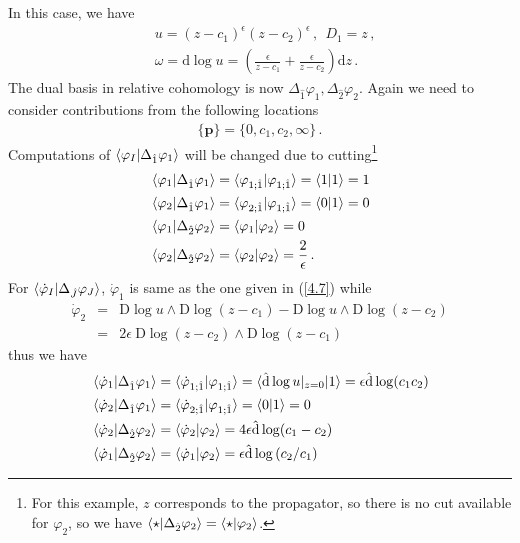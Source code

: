 \documentclass[a4paper,11pt]{article}
\newcommand{\nn}{\nonumber}
\newcommand{\nd}{\mathrm{d}}
\newcommand{\nD}{\mathrm{D}}
\newcommand{\nds}{\hat{\mathrm{d}}}
\newcommand{\ep}{\epsilon}
\newcommand{\bea}{\begin{eqnarray}}
\newcommand{\eea}{\end{eqnarray}}
\def\eref#1{(\ref{#1})}
\begin{document}
In this case, we have
\begin{align}
&u= (z-c_1)^\ep(z-c_2)^\ep
\, , \ \  D_1=z \, ,   \nn\\
&\omega=\nd \log u = \left( \frac{\ep}{z-c_1}+ \frac{\ep}{z-c_2} \right) \nd z \, .
\end{align}
The dual basis in relative cohomology is now $\Delta_{\hat{1}}\varphi_1, \Delta_{\hat{2}}\varphi_2$.  
Again we need to consider contributions from the following locations 
\begin{align}
\{\bm{p}\}=\{0,c_1,c_2,\infty\} \, .
\end{align}
Computations of $\braket{\varphi_I|\Delta_{\hat{1}}\varphi_1}$ will be changed due to cutting\footnote{For this example, $z$ corresponds to the propagator, so there is no cut available for $\varphi_2$, so we have  $\braket{\star|\Delta_{\hat{2}}\varphi_2}=\braket{\star|\varphi_2} $.} 
\begin{align}
&\braket{\varphi_1|\Delta_{\hat{1}}\varphi_1}=\braket{\varphi_{1;\hat{1}}|\varphi_{1;\hat{1}}} = \braket{1|1}=1  \nn\\
&\braket{\varphi_2|\Delta_{\hat{1}}\varphi_1}=\braket{\varphi_{2;\hat{1}}|\varphi_{1;\hat{1}}} = \braket{0|1}=0 \nn\\
& \braket{\varphi_1|\Delta_{\hat{2}}\varphi_2}=\braket{\varphi_1|\varphi_2}=0\nn \\
& \braket{\varphi_2|\Delta_{\hat{2}}\varphi_2}=\braket{\varphi_2|\varphi_2}={2\over \epsilon} \, . ~~~\label{4.16}
\end{align}
%
For $\braket{\dot{\varphi}_I|\Delta_{\hat{J}}\varphi_J}$, $\dot{\varphi}_1$ is same as the one given in \eref{4.7} 
while
%
\bea \dot{\varphi}_2 &= & \nD \log u \wedge \nD \log \left(z-c_1\right) - \nD \log u \wedge \nD \log \left(z-c_2\right) \nn\\
& = &2 \ep ~  \nD \log \left(z-c_2\right) \wedge \nD \log \left(z-c_1\right) \eea
%
thus we have
\begin{align}
&\braket{\dot{\varphi}_1|\Delta_{\hat{1}}\varphi_1}=\braket{\dot{\varphi}_{1;\hat{1}}|\varphi_{1;\hat{1}}} = \braket{\nds\log u|_{z=0}|1}= \ep \nds \log (c_1 c_2) \nn\\
%
&\braket{\dot{\varphi}_2|\Delta_{\hat{1}}\varphi_1}=\braket{\dot{\varphi}_{2;\hat{1}}|\varphi_{1;\hat{1}}} = \braket{0|1}= 0 \nn \\
%
& \braket{\dot{\varphi}_2|\Delta_{\hat{2}}\varphi_2}=\braket{\dot{\varphi}_2|\varphi_2} = 4\ep \nds \log(c_1-c_2)\nn \\
%
&\braket{\dot{\varphi}_1|\Delta_{\hat{2}}\varphi_2}=\braket{\dot{\varphi}_1|\varphi_2}=\ep \nds \log \left(c_2/c_1\right)
\end{align}
\end{document}
